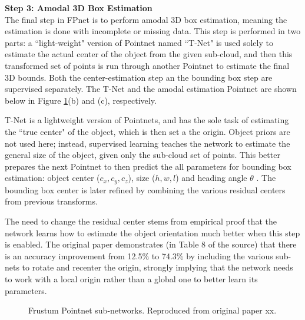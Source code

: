 \textbf{{\large Step 3: Amodal 3D Box Estimation}} \\
The final step in FPnet is to perform amodal 3D box estimation, meaning the estimation is done with incomplete or missing data. This step is performed in two parts: a ``light-weight" version of Pointnet named ``T-Net" is used solely to estimate the actual center of the object from the given sub-cloud, and then this transformed set of points is run through another Pointnet to estimate the final 3D bounds. Both the center-estimation step an the bounding box step are supervised separately. The T-Net and the amodal estimation Pointnet are shown below in Figure \ref{fpnet_subarch}(b) and (c), respectively. 

T-Net is a lightweight version of Pointnets, and has the sole task of estimating the ``true center" \cite{qi_frustum_2017} of the object, which is then set a the origin. Object priors are not used here; instead, supervised learning teaches the network to estimate the general size of the object, given only the sub-cloud set of points. This better prepares the next Pointnet to then predict the all parameters for bounding box estimation: object center ($c_x,c_y,c_z$), size ($h,w,l$) and heading angle $\theta$ \cite{qi_frustum_2017}. The bounding box center is later refined by combining the various residual centers from previous transforms. 

The need to change the residual center stems from empirical proof that the network learns how to estimate the object orientation much better when this step is enabled. The original paper demonstrates (in Table 8 of the source) that there is an accuracy improvement from 12.5\% to 74.3\% by including the various sub-nets to rotate and recenter the origin, strongly implying that the network needs to work with a local origin rather than a global one to better learn its parameters. 

 \begin{figure}[H]
 	\centering
 	\caption{Frustum Pointnet sub-networks. Reproduced from original paper \cite{qi_frustum_2017} xx.}
 	\label{fpnet_subarch}
 \end{figure}


